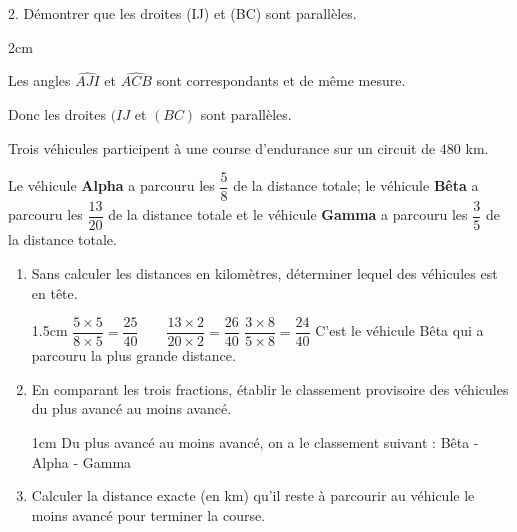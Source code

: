 \documentclass[a4paper]{book}
\begin{document}
{\begin{exercice}
        2. Démontrer que les droites (IJ) et (BC) sont parallèles.
        \begin{ZoneReponse}{2cm}

            Les angles $\widehat{AJI}$ et $\widehat{ACB}$ sont correspondants et de même mesure.

            Donc les droites $(IJ$ et $(BC)$ sont parallèles.
        \end{ZoneReponse}
    \end{exercice}


    \medskip

    \begin{exercice}
        Trois véhicules participent à une course d'endurance sur un circuit de $480$ km.
        
        Le véhicule \textbf{Alpha} a parcouru les $\dfrac{5}{8}$ de la distance totale; 
        le véhicule \textbf{Bêta} a parcouru les $\dfrac{13}{20}$ de la distance totale
        et le véhicule \textbf{Gamma} a parcouru les $\dfrac{3}{5}$ de la distance totale.

        \begin{enumerate}
            \item Sans calculer les distances en kilomètres, déterminer lequel des véhicules est en tête.

            \begin{ZoneReponse}{1.5cm}
                $\dfrac{5\times5}{8\times5}=\dfrac{25}{40} \quad \quad \dfrac{13\times2}{20\times2}=\dfrac{26}{40}$ \quad \quad $\dfrac{3\times8}{5\times8}=\dfrac{24}{40}$
                C'est le véhicule Bêta qui a parcouru la plus grande distance.
            \end{ZoneReponse}
            
            \item En comparant les trois fractions, établir le classement provisoire des véhicules du plus avancé au moins avancé.

            \begin{ZoneReponse}{1cm}
                Du plus avancé au moins avancé, on a le classement suivant : Bêta - Alpha - Gamma
            \end{ZoneReponse}

\newpage
            
            \item Calculer la distance exacte (en km) qu'il reste à parcourir au véhicule le moins avancé pour terminer la course.


\end{enumerate}
\end{exercice}}
\end{document}
